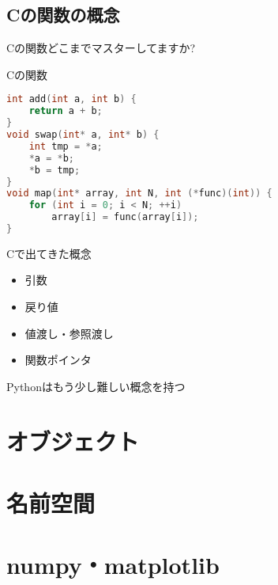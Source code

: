 \documentclass[12pt, xetex, xcolor=pdftex, dvipsnames]{beamer}
\begin{document}
\subsection{Cの関数の概念}
\begin{frame}
    \alert{\Large Cの関数どこまでマスターしてますか?}
\end{frame}
\begin{frame}[fragile]{Cの関数}
    \begin{lstlisting}[language={C}]
int add(int a, int b) {
    return a + b;
}
void swap(int* a, int* b) {
    int tmp = *a;
    *a = *b;
    *b = tmp;
}
void map(int* array, int N, int (*func)(int)) {
    for (int i = 0; i < N; ++i)
        array[i] = func(array[i]);
}
    \end{lstlisting}
\end{frame}
\begin{frame}{Cで出てきた概念}
    \begin{itemize}
        \item 引数
        \item 戻り値
        \item 値渡し・参照渡し
        \item 関数ポインタ
    \end{itemize}

    \pause
    Pythonはもう少し難しい概念を持つ
\end{frame}

\section{オブジェクト}

\section{名前空間}

\section{numpy・matplotlib}
\end{document}
